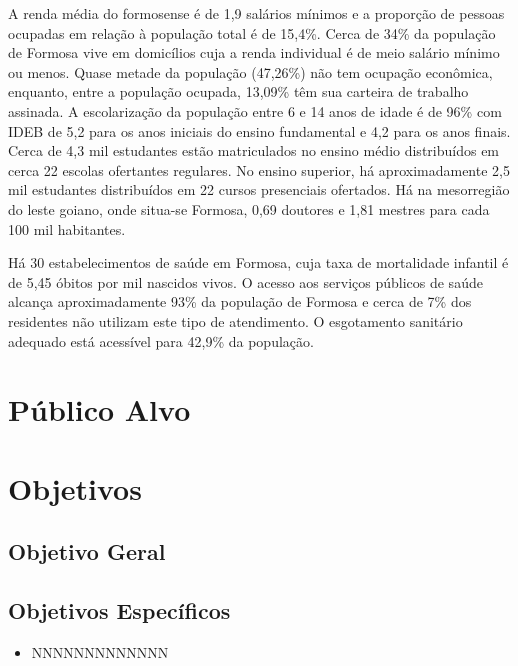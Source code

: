 \documentclass[11pt,fleqn]{book} %
\begin{document}
A renda média do formosense é de 1,9 salários mínimos e a proporção de pessoas ocupadas em relação à população total é de 15,4\%. Cerca de 34\% da população de Formosa vive em domicílios cuja a renda individual é de meio salário mínimo ou menos. Quase metade da população (47,26\%) não tem ocupação econômica, enquanto, entre a população ocupada, 13,09\% têm sua carteira de trabalho assinada.
A escolarização da população entre 6 e 14 anos de idade é de 96\% com IDEB de 5,2 para os anos iniciais do ensino fundamental e 4,2 para os anos finais. Cerca de 4,3 mil estudantes estão matriculados no ensino médio distribuídos em cerca 22 escolas ofertantes regulares. No ensino superior, há aproximadamente 2,5 mil estudantes distribuídos em 22 cursos presenciais ofertados. Há na mesorregião do leste goiano, onde situa-se Formosa, 0,69 doutores e 1,81 mestres para cada 100 mil habitantes.

Há 30 estabelecimentos de saúde em Formosa, cuja taxa de mortalidade infantil é de 5,45 óbitos por mil nascidos vivos. O acesso aos serviços públicos de saúde alcança aproximadamente 93\%  da população de Formosa e cerca de 7\% dos residentes não utilizam este tipo de atendimento. O esgotamento sanitário adequado está acessível para 42,9\% da população.



\section{Público Alvo}


\section{Objetivos}\label{objetivos}

\subsection{Objetivo Geral}


\subsection{Objetivos Específicos}

\begin{itemize}
\item NNNNNNNNNNNNN 
\end{itemize}
\end{document}
